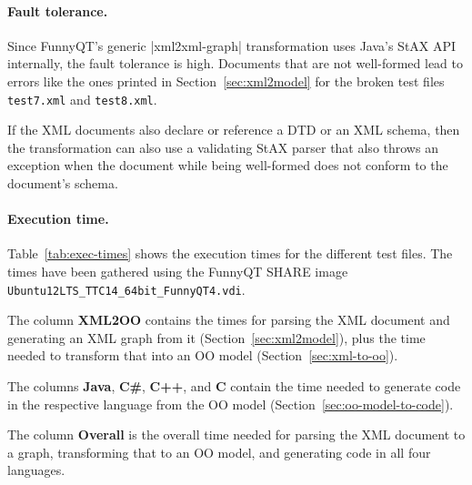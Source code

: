 \documentclass[a4paper]{article}
\newcommand{\code}{\clojureinline}
\begin{document}
\paragraph{Fault tolerance.}
\label{sec:fault-tolerance}

Since FunnyQT's generic \code|xml2xml-graph| transformation uses Java's StAX
API internally, the fault tolerance is high.  Documents that are not
well-formed lead to errors like the ones printed in Section~\ref{sec:xml2model}
for the broken test files \texttt{test7.xml} and \texttt{test8.xml}.

If the XML documents also declare or reference a DTD or an XML schema, then the
transformation can also use a validating StAX parser that also throws an
exception when the document while being well-formed does not conform to the
document's schema.


\paragraph{Execution time.}
\label{sec:execution-time}

Table~\ref{tab:exec-times} shows the execution times for the different test
files.  The times have been gathered using the FunnyQT SHARE image
\texttt{Ubuntu12LTS\_TTC14\_64bit\_FunnyQT4.vdi}.

The column \textbf{XML2OO} contains the times for parsing the XML document and
generating an XML graph from it (Section~\ref{sec:xml2model}), plus the time
needed to transform that into an OO model (Section~\ref{sec:xml-to-oo}).

The columns \textbf{Java}, \textbf{C\#}, \textbf{C++}, and \textbf{C} contain
the time needed to generate code in the respective language from the OO model
(Section~\ref{sec:oo-model-to-code}).

The column \textbf{Overall} is the overall time needed for parsing the XML
document to a graph, transforming that to an OO model, and generating code in
all four languages.
\end{document}
